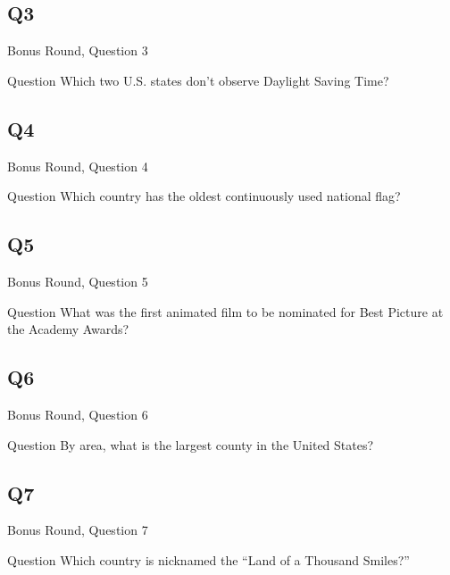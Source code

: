 \documentclass[11pt]{beamer}
\begin{document}
\subsection*{Q3}
\begin{frame}[t]{Bonus Round, Question 3}
\vspace{2em}
\begin{block}{Question}
Which two U.S. states don't observe Daylight Saving Time\@?
\end{block}
\end{frame}
    

\subsection*{Q4}
\begin{frame}[t]{Bonus Round, Question 4}
\vspace{2em}
\begin{block}{Question}
Which country has the oldest continuously used national flag\@?
\end{block}
\end{frame}
    

\subsection*{Q5}
\begin{frame}[t]{Bonus Round, Question 5}
\vspace{2em}
\begin{block}{Question}
What was the first animated film to be nominated for Best Picture at the Academy Awards\@?
\end{block}
\end{frame}
    

\subsection*{Q6}
\begin{frame}[t]{Bonus Round, Question 6}
\vspace{2em}
\begin{block}{Question}
By area, what is the largest county in the United States\@?
\end{block}
\end{frame}
    

\subsection*{Q7}
\begin{frame}[t]{Bonus Round, Question 7}
\vspace{2em}
\begin{block}{Question}
Which country is nicknamed the ``Land of a Thousand Smiles?''
\end{block}
\end{frame}
    
\end{document}
